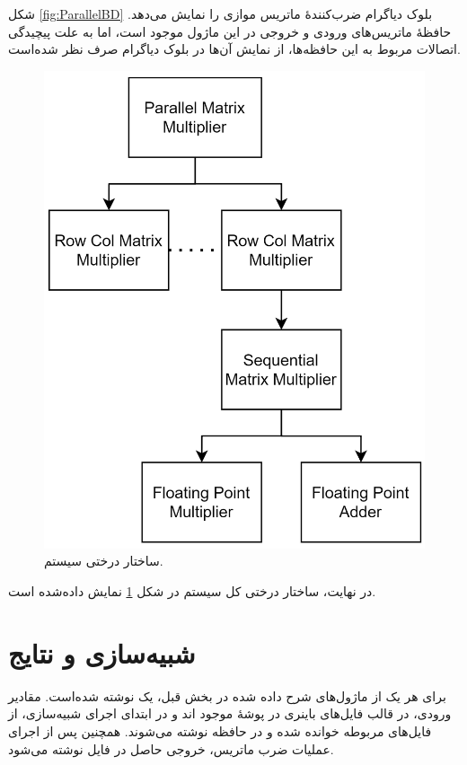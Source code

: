 \documentclass[conference]{IEEEtran-ModifiedForMVIP}
\begin{document}
شکل
\ref{fig:ParallelBD}
بلوک دیاگرام ضرب‌کنندهٔ ماتریس موازی را نمایش می‌دهد.
حافظهٔ ماتریس‌های ورودی و خروجی در این ماژول موجود است، اما به علت پیچیدگی اتصالات مربوط به این حافظه‌ها، از نمایش آن‌ها در بلوک دیاگرام صرف نظر شده‌است. 

\begin{figure}[t]
\centering 
\includegraphics[width=\linewidth]{Images/HierarchicalTree.png}
\caption{
\centering
ساختار درختی سیستم.
}\label{fig:HierarchicalTree}
\end{figure}

در نهایت، ساختار درختی کل سیستم در شکل
\ref{fig:HierarchicalTree}
نمایش داده‌شده است.

\section{شبیه‌سازی و نتایج}

برای هر یک از ماژول‌های شرح داده شده در بخش قبل، یک
نوشته شده‌است.
مقادیر ورودی، در قالب فایل‌های باینری در پوشهٔ
موجود اند و در ابتدای اجرای شبیه‌سازی، از فایل‌های مربوطه خوانده شده و در حافظه نوشته می‌شوند.
همچنین پس از اجرای عملیات ضرب ماتریس، خروجی حاصل در فایل
نوشته می‌شود.
\end{document}
